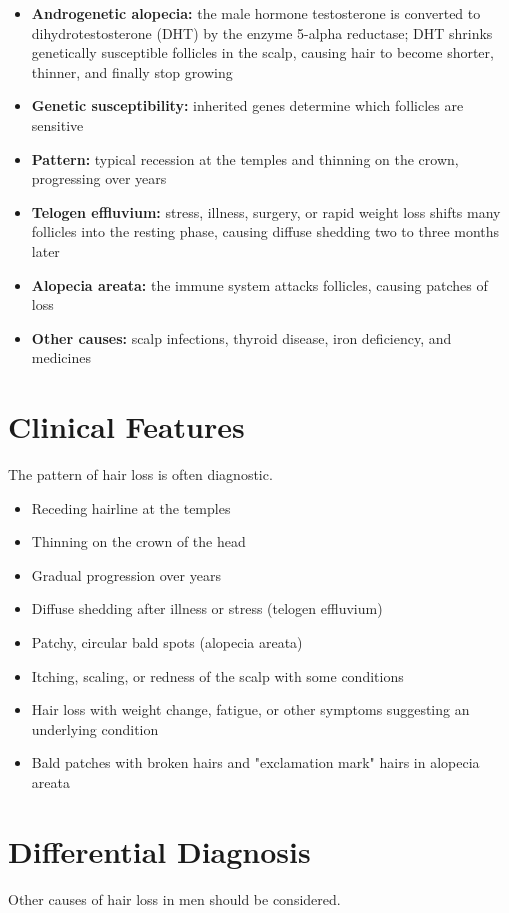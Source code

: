 \begin{itemize}
    \item \textbf{Androgenetic alopecia:} the male hormone testosterone is converted to dihydrotestosterone (DHT) by the enzyme 5-alpha reductase; DHT shrinks genetically susceptible follicles in the scalp, causing hair to become shorter, thinner, and finally stop growing
    \item \textbf{Genetic susceptibility:} inherited genes determine which follicles are sensitive
    \item \textbf{Pattern:} typical recession at the temples and thinning on the crown, progressing over years
    \item \textbf{Telogen effluvium:} stress, illness, surgery, or rapid weight loss shifts many follicles into the resting phase, causing diffuse shedding two to three months later
    \item \textbf{Alopecia areata:} the immune system attacks follicles, causing patches of loss
    \item \textbf{Other causes:} scalp infections, thyroid disease, iron deficiency, and medicines
\end{itemize}

\section*{Clinical Features}
The pattern of hair loss is often diagnostic.

\begin{itemize}
    \item Receding hairline at the temples
    \item Thinning on the crown of the head
    \item Gradual progression over years
    \item Diffuse shedding after illness or stress (telogen effluvium)
    \item Patchy, circular bald spots (alopecia areata)
    \item Itching, scaling, or redness of the scalp with some conditions
    \item Hair loss with weight change, fatigue, or other symptoms suggesting an underlying condition
    \item Bald patches with broken hairs and "exclamation mark" hairs in alopecia areata
\end{itemize}

\section*{Differential Diagnosis}
Other causes of hair loss in men should be considered.

